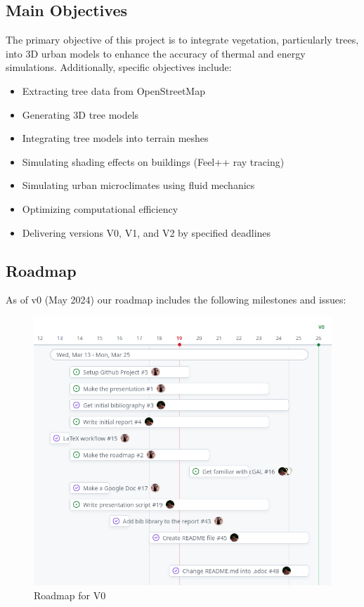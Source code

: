 \documentclass[12pt]{article}
\begin{document}
\subsection{Main Objectives}
The primary objective of this project is to integrate vegetation, particularly 
trees, into 3D urban models to enhance the accuracy of thermal and energy simulations. 
Additionally, specific objectives include:
\begin{itemize}
    \item Extracting tree data from OpenStreetMap
    \item Generating 3D tree models
    \item Integrating tree models into terrain meshes
    \item Simulating shading effects on buildings (Feel++ ray tracing)
    \item Simulating urban microclimates using fluid mechanics
    \item Optimizing computational efficiency
    \item Delivering versions V0, V1, and V2 by specified deadlines
\end{itemize}

\subsection{Roadmap}
As of v0 (May 2024) our roadmap includes the following milestones and issues:  
\begin{figure}[H]
    \centering
    \includegraphics[width=1\textwidth]{images/roadmap_v0.png}
    \caption{Roadmap for V0}
\end{figure}
\end{document}
